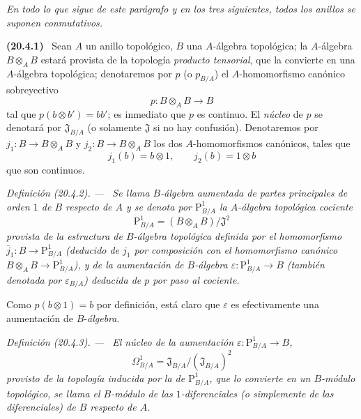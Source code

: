 \documentclass[10pt,oneside]{book}
\makeatletter
\newcommand{\setmanualcurrentlabel}[1]{\def\@currentlabel{#1}}
\newcommand{\oldpage}[2][]{%
  \setcounter{footnote}{0}%
  \marginpar{\scriptsize\textbf{#1}~|~#2}\ignorespaces}
\newenvironment{env}[1][]{\setmanualcurrentlabel{#1}\par\medskip\noindent\textbf{(#1)}\ }{\par}
\newenvironment{definition}[1][]{%
  \setmanualcurrentlabel{#1}\par\medskip\noindent\itshape Definición (#1). ---\ }{\par}
\makeatother
\begin{document}
\textit{En todo lo que sigue de este parágrafo y en los tres siguientes, todos los
anillos se suponen conmutativos.}

\begin{env}[20.4.1]
\label{0.20.4.1-es}
Sean $A$ un anillo topológico, $B$ una $A$-álgebra topológica; la
$A$-álgebra $B\otimes_A B$ estará provista de la topología \emph{producto
tensorial}, que la convierte en una $A$-álgebra topológica; denotaremos por $p$
(o $p_{B/A}$) el $A$-homomorfismo canónico sobreyectivo
\begin{equation}
\tag{20.4.1.1}
\label{0.20.4.1.1-es}
  p:B\otimes_A B\to B
\end{equation}
tal que $p(b\otimes b')=bb'$; es inmediato que $p$ es continuo. El
\emph{núcleo} de $p$ se denotará por $\mathfrak{J}_{B/A}$ (o solamente
$\mathfrak{J}$ si no hay confusión). Denotaremos por
$j_1:B\to B\otimes_A B$ y $j_2:B\to B\otimes_A B$ los dos
$A$-homomorfismos canónicos, tales que
\[
  j_1(b)=b\otimes1, \qquad j_2(b)=1\otimes b
\]
que son continuos.
\end{env}

\oldpage[0\textsubscript{IV-1}]{124}
\begin{definition}[20.4.2]
\label{0.20.4.2-es}
Se llama $B$-álgebra aumentada de partes principales de orden $1$ de
$B$ respecto de $A$ y se denota por $\mathrm{P}^1_{B/A}$ la $A$-álgebra
topológica cociente
\begin{equation}
\tag{20.4.2.1}
\label{0.20.4.2.1-es}
  \mathrm{P}^1_{B/A}=(B\otimes_A B)/\mathfrak{J}^2
\end{equation}
provista de la estructura de $B$-álgebra topológica definida por el homomorfismo
$\bar{j}_1:B\to\mathrm{P}^1_{B/A}$ (deducido de $j_1$ por composición con
el homomorfismo canónico $B\otimes_A B\to\mathrm{P}^1_{B/A}$), y de
la aumentación de $B$-álgebra $\varepsilon:\mathrm{P}^1_{B/A}\to B$ (también
denotada por $\varepsilon_{B/A}$) deducida de $p$ por paso al cociente.
\end{definition}

Como $p(b\otimes1)=b$ por definición, está claro que $\varepsilon$ es
efectivamente una aumentación de $B$-\emph{álgebra}.

\begin{definition}[20.4.3]
\label{0.20.4.3-es}
El núcleo de la aumentación $\varepsilon:\mathrm{P}^1_{B/A}\to B$,
\begin{equation}
\tag{20.4.3.1}
\label{0.20.4.3.1-es}
  \Omega^1_{B/A}=\mathfrak{J}_{B/A}/(\mathfrak{J}_{B/A})^2
\end{equation}
provisto de la topología inducida por la de $\mathrm{P}^1_{B/A}$, que lo convierte
en un $B$-módulo topológico, se llama el $B$-módulo de las
$1$-diferenciales \textup{(o simplemente de las} diferenciales) de $B$
respecto de $A$.
\end{definition}
\end{document}
